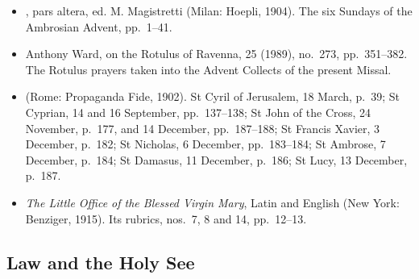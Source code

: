\begin{itemize}[leftmargin=1.3em, itemsep=0.3em]
\item {}, pars altera, ed. M. Magistretti (Milan: Hoepli, 1904). The six
Sundays of the Ambrosian Advent, pp.~1--41.
\item Anthony Ward, on the Rotulus of Ravenna,  25 (1989), no.~273, pp.~351--382.
The Rotulus prayers taken into the Advent Collects of the present Missal.
\item {} (Rome: Propaganda Fide, 1902). St Cyril of Jerusalem,
18 March, p.~39; St Cyprian, 14 and 16 September, pp.~137--138; St John of the Cross,
24 November, p.~177, and 14 December, pp.~187--188; St Francis Xavier, 3 December, p.~182;
St Nicholas, 6 December, pp.~183--184; St Ambrose, 7 December, p.~184; St Damasus, 11 December,
p.~186; St Lucy, 13 December, p.~187.
\item \textit{The Little Office of the Blessed Virgin Mary}, Latin and English (New York: Benziger,
1915). Its rubrics, nos.~7, 8 and 14, pp.~12--13.
\end{itemize}

\subsection{Law and the Holy See}

